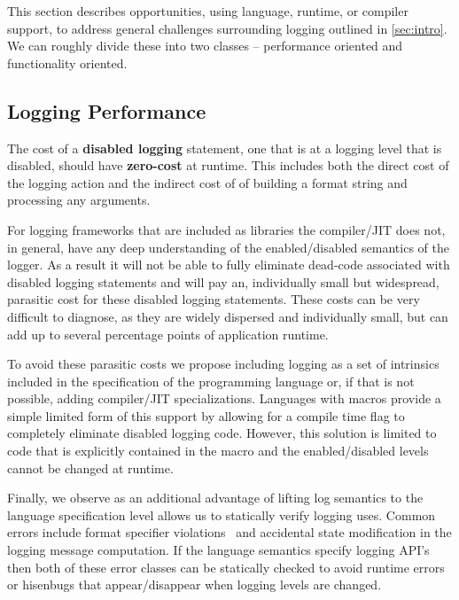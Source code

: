 This section describes opportunities, using language, runtime, or compiler support, to address 
general challenges surrounding logging outlined in \autoref{sec:intro}. We can roughly divide 
these into two classes -- performance oriented and functionality oriented. 

\subsection{Logging Performance}
\label{subsec:performancedesign}

\begin{design}
The cost of a \textbf{disabled logging} statement, one that is at a logging level that is disabled, 
should have \textbf{zero-cost} at runtime. This includes both the direct cost of the logging action 
and the indirect cost of of building a format string and processing any arguments. 
\end{design}
For logging frameworks that are included as libraries the compiler/JIT does not, in general, have 
any deep understanding of the enabled/disabled semantics of the logger. As a result it will not be 
able to fully eliminate dead-code associated with disabled logging statements and will pay an, 
individually small but widespread, parasitic cost for these disabled logging statements. These 
costs can be very difficult to diagnose, as they are widely dispersed and individually small, but can 
add up to several percentage points of application runtime.

To avoid these parasitic costs we propose including logging as a set of intrinsics included in the 
specification of the programming language or, if that is not possible, adding compiler/JIT specializations. 
Languages with macros provide a simple limited form of this support by allowing for a compile time flag 
to completely eliminate disabled logging code. However, this solution is limited to code that is explicitly 
contained in the macro and the enabled/disabled levels cannot be changed at runtime. 

Finally, we observe as an additional advantage of lifting log semantics to the language specification level 
allows us to statically verify logging uses. Common errors include format specifier violations~\cite{tyepcheckprintf} 
and accidental state modification in the logging message computation. If the language semantics specify 
logging API's then both of these error classes can be statically checked to avoid runtime errors or hisenbugs 
that appear/disappear when logging levels are changed.


